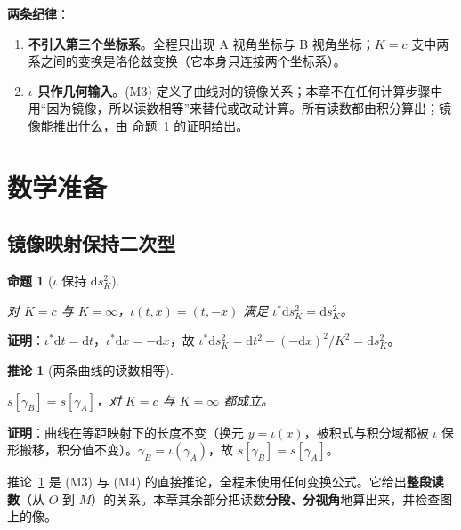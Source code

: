 \documentclass[
  chinese,
  a4paper,
  UTF8,
  12pt,
  oneside,
  openany]{ctexbook}
\providecommand{\tightlist}{%
  \setlength{\itemsep}{0pt}\setlength{\parskip}{0pt}}
\theoremstyle{plain}
\theoremstyle{plain}
\theoremstyle{plain}
\newtheorem{proposition}{命题}[chapter]
\theoremstyle{definition}
\theoremstyle{plain}
\newtheorem{corollary}{推论}[chapter]
\theoremstyle{plain}
\theoremstyle{remark}
\begin{document}
\textbf{两条纪律}：

\begin{enumerate}
\def\labelenumi{\arabic{enumi}.}
\tightlist
\item
  \textbf{不引入第三个坐标系}。全程只出现 A 视角坐标与 B
  视角坐标；\(K=c\)
  支中两系之间的变换是洛伦兹变换（它本身只连接两个坐标系）。
\item
  \textbf{\(\iota\) 只作几何输入}。(M3)
  定义了曲线对的镜像关系；本章不在任何计算步骤中用``因为镜像，所以读数相等''来替代或改动计算。所有读数都由积分算出；镜像能推出什么，由
  命题~\ref{prp-tn-isometry} 的证明给出。
\end{enumerate}

\section{数学准备}\label{sec-tn-math}

\subsection{镜像映射保持二次型}\label{ux955cux50cfux6620ux5c04ux4fddux6301ux4e8cux6b21ux578b}

\begin{proposition}[\(\iota\) 保持
\(\mathrm{d}s^{2}_{K}\)]\protect\hypertarget{prp-tn-isometry}{}\label{prp-tn-isometry}

对 \(K=c\) 与 \(K=\infty\)，\(\iota(t,x)=(t,-x)\) 满足
\(\iota^{*}\mathrm{d}s^{2}_{K}=\mathrm{d}s^{2}_{K}\)。

\end{proposition}

\textbf{证明}：\(\iota^{*}\mathrm{d}t=\mathrm{d}t\)，\(\iota^{*}\mathrm{d}x=-\mathrm{d}x\)，故
\(\iota^{*}\mathrm{d}s^{2}_{K}=\mathrm{d}t^{2}-(-\mathrm{d}x)^{2}/K^{2}=\mathrm{d}s^{2}_{K}\)。

\begin{corollary}[两条曲线的读数相等]\protect\hypertarget{cor-tn-length}{}\label{cor-tn-length}

\(s[\gamma_B]=s[\gamma_A]\)，对 \(K=c\) 与 \(K=\infty\) 都成立。

\end{corollary}

\textbf{证明}：曲线在等距映射下的长度不变（换元
\(y=\iota(x)\)，被积式与积分域都被 \(\iota\)
保形搬移，积分值不变）。\(\gamma_B=\iota(\gamma_A)\)，故
\(s[\gamma_B]=s[\gamma_A]\)。

推论~\ref{cor-tn-length} 是 (M3) 与 (M4)
的直接推论，全程未使用任何变换公式。它给出\textbf{整段读数}（从 \(O\) 到
\(M\)）的关系。本章其余部分把读数\textbf{分段、分视角}地算出来，并检查图上的像。
\end{document}

